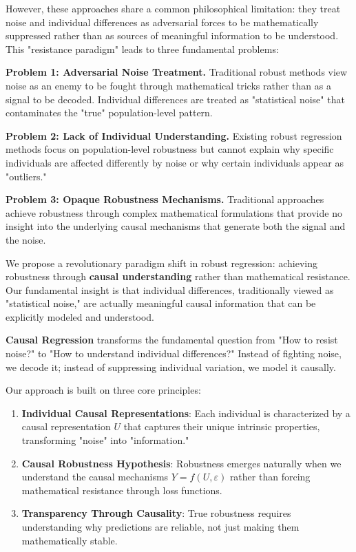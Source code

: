 \documentclass[conference]{IEEEtran}
\begin{document}
However, these approaches share a common philosophical limitation: they treat noise and individual differences as adversarial forces to be mathematically suppressed rather than as sources of meaningful information to be understood. This "resistance paradigm" leads to three fundamental problems:

\textbf{Problem 1: Adversarial Noise Treatment.} Traditional robust methods view noise as an enemy to be fought through mathematical tricks rather than as a signal to be decoded. Individual differences are treated as "statistical noise" that contaminates the "true" population-level pattern.

\textbf{Problem 2: Lack of Individual Understanding.} Existing robust regression methods focus on population-level robustness but cannot explain why specific individuals are affected differently by noise or why certain individuals appear as "outliers."

\textbf{Problem 3: Opaque Robustness Mechanisms.} Traditional approaches achieve robustness through complex mathematical formulations that provide no insight into the underlying causal mechanisms that generate both the signal and the noise.

We propose a revolutionary paradigm shift in robust regression: achieving robustness through \textbf{causal understanding} rather than mathematical resistance. Our fundamental insight is that individual differences, traditionally viewed as "statistical noise," are actually meaningful causal information that can be explicitly modeled and understood.

\textbf{Causal Regression} transforms the fundamental question from "How to resist noise?" to "How to understand individual differences?" Instead of fighting noise, we decode it; instead of suppressing individual variation, we model it causally.

Our approach is built on three core principles:

\begin{enumerate}
\item \textbf{Individual Causal Representations}: Each individual is characterized by a causal representation $U$ that captures their unique intrinsic properties, transforming "noise" into "information."

\item \textbf{Causal Robustness Hypothesis}: Robustness emerges naturally when we understand the causal mechanisms $Y = f(U, \varepsilon)$ rather than forcing mathematical resistance through loss functions.

\item \textbf{Transparency Through Causality}: True robustness requires understanding why predictions are reliable, not just making them mathematically stable.
\end{enumerate}
\end{document}
